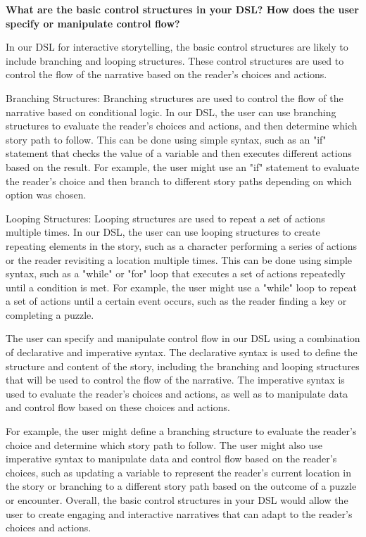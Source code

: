\textbf {What are the basic control structures in your DSL? How does the user specify or manipulate control flow?}

In our DSL for interactive storytelling, the basic control structures are likely to include branching and looping structures. These control structures are used to control the flow of the narrative based on the reader's choices and actions.

Branching Structures: Branching structures are used to control the flow of the narrative based on conditional logic. In our DSL, the user can use branching structures to evaluate the reader's choices and actions, and then determine which story path to follow. This can be done using simple syntax, such as an "if" statement that checks the value of a variable and then executes different actions based on the result. For example, the user might use an "if" statement to evaluate the reader's choice and then branch to different story paths depending on which option was chosen.

Looping Structures: Looping structures are used to repeat a set of actions multiple times. In our DSL, the user can use looping structures to create repeating elements in the story, such as a character performing a series of actions or the reader revisiting a location multiple times. This can be done using simple syntax, such as a "while" or "for" loop that executes a set of actions repeatedly until a condition is met. For example, the user might use a "while" loop to repeat a set of actions until a certain event occurs, such as the reader finding a key or completing a puzzle.

The user can specify and manipulate control flow in our DSL using a combination of declarative and imperative syntax. The declarative syntax is used to define the structure and content of the story, including the branching and looping structures that will be used to control the flow of the narrative. The imperative syntax is used to evaluate the reader's choices and actions, as well as to manipulate data and control flow based on these choices and actions.

For example, the user might define a branching structure to evaluate the reader's choice and determine which story path to follow. The user might also use imperative syntax to manipulate data and control flow based on the reader's choices, such as updating a variable to represent the reader's current location in the story or branching to a different story path based on the outcome of a puzzle or encounter. Overall, the basic control structures in your DSL would allow the user to create engaging and interactive narratives that can adapt to the reader's choices and actions.


